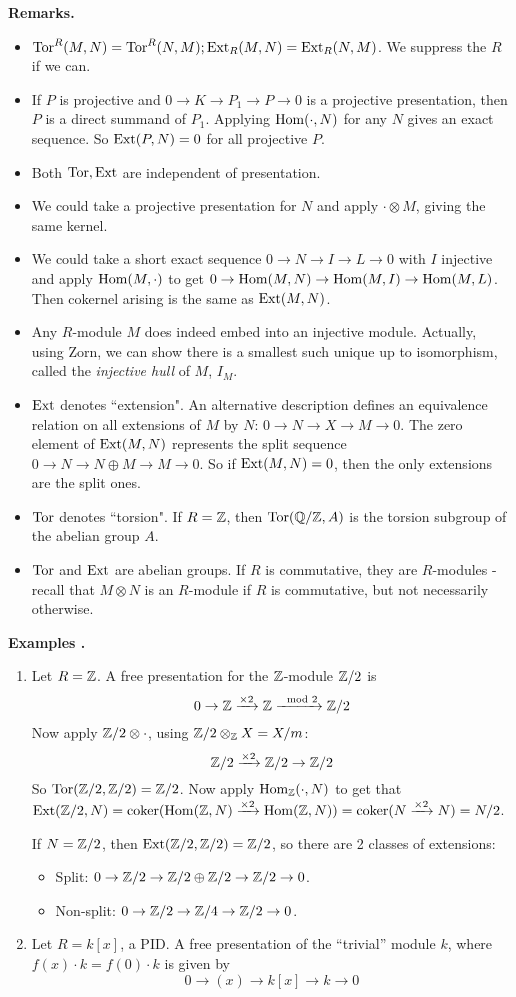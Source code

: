 \documentclass[10pt,a4paper]{article}
\begin{document}
\textbf{Remarks.}
\begin{itemize}
  \item $\operatorname{Tor}^R(M,N) = \operatorname{Tor}^R(N,M); \operatorname{Ext}_R(M,N) = \operatorname{Ext}_R(N,M)$. We suppress the $R$ if we can.
  \item If $P$ is projective and $0 \to K \to P_1 \to P \to 0$ is a projective presentation, then $P$ is a direct summand of $P_1$. Applying $\operatorname{Hom}(\cdot, N)$ for any $N$ gives an exact sequence. So $\operatorname{Ext}(P, N) = 0$ for all projective $P$.
  \item Both $\operatorname{Tor}, \operatorname{Ext}$ are independent of presentation.
  \item We could take a projective presentation for $N$ and apply $\cdot \otimes M$, giving the same kernel.
  \item We could take a short exact sequence $0 \to N \to I \to L\to 0$ with $I$ injective and apply $\operatorname{Hom}(M, \cdot)$ to get $0 \to \operatorname{Hom}(M,N) \to \operatorname{Hom}(M,I) \to \operatorname{Hom}(M,L)$. Then cokernel arising is the same as $\operatorname{Ext}(M,N)$.
  \item Any $R$-module $M$ does indeed embed into an injective module. Actually, using Zorn, we can show there is a smallest such unique up to isomorphism, called the \emph{injective hull} of $M$, $I_M$.
  \item $\operatorname{Ext}$ denotes ``extension". An alternative description defines an equivalence relation on all extensions of $M$ by $N$: $0 \to N \to X \to M\to 0$. The zero element of $\operatorname{Ext}(M,N)$ represents the split sequence $0 \to N \to N \oplus M \to M \to 0$. So if $\operatorname{Ext}(M,N) = 0$, then the only extensions are the split ones.
  \item $\operatorname{Tor}$ denotes ``torsion". If $R = \mathbb{Z}$, then $\operatorname{Tor}(\mathbb{Q}/\mathbb{Z}, A)$ is the torsion subgroup of the abelian group $A$.
  \item $\operatorname{Tor}$ and $\operatorname{Ext}$ are abelian groups. If $R$ is commutative, they are $R$-modules - recall that $M \otimes N$ is an $R$-module if $R$ is commutative, but not necessarily otherwise.
\end{itemize}
\textbf{Examples \thetheorem.}
\begin{enumerate}
  \item Let $R = \mathbb{Z}$. A free presentation for the $\mathbb{Z}$-module $\mathbb{Z}/2$ is
  \[0 \to \mathbb{Z} \xrightarrow{\times 2} \mathbb{Z} \xrightarrow{\mod 2} \mathbb{Z}/2\]
  Now apply $\mathbb{Z}/2 \otimes \cdot$, using $\mathbb{Z}/2 \otimes_{\mathbb{Z}} X = X/m$:
  \[\mathbb{Z}/2 \xrightarrow{\times 2} \mathbb{Z}/2 \to \mathbb{Z}/2\]
  So $\operatorname{Tor}(\mathbb{Z}/2, \mathbb{Z}/2) = \mathbb{Z}/2$. Now apply $\operatorname{Hom}_{\mathbb{Z}}(\cdot, N)$ to get that $\operatorname{Ext}(\mathbb{Z}/2, N) = \operatorname{coker}(\operatorname{Hom}(\mathbb{Z}, N)\xrightarrow{\times 2}\operatorname{Hom}(\mathbb{Z}, N)) = \operatorname{coker}(N \xrightarrow{\times 2} N) = N/2$.

  If $N = \mathbb{Z}/2$, then $\operatorname{Ext}(\mathbb{Z}/2, \mathbb{Z}/2) = \mathbb{Z}/2$, so there are 2 classes of extensions:
  \begin{itemize}
    \item Split: $0 \to \mathbb{Z}/2 \to \mathbb{Z}/2 \oplus \mathbb{Z}/2 \to \mathbb{Z}/2 \to 0$.
    \item Non-split: $0 \to \mathbb{Z}/2 \to \mathbb{Z}/4 \to \mathbb{Z}/2 \to 0$.
  \end{itemize}
  \item Let $R = k[x]$, a PID. A free presentation of the ``trivial'' module $k$, where $f(x)\cdot k = f(0)\cdot k$ is given by
  \[0 \to (x) \to k[x] \to k \to 0\]
\end{enumerate}
\end{document}
